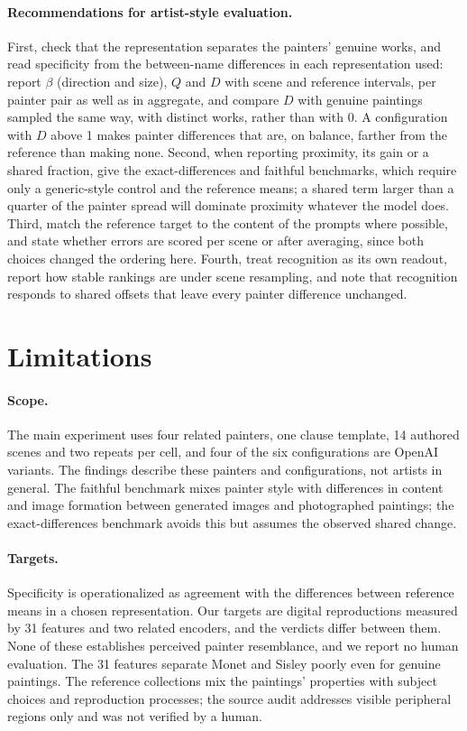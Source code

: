 \documentclass[10pt]{article}
\begin{document}
\paragraph{Recommendations for artist-style evaluation.}
First, check that the representation separates the painters' genuine works, and read specificity
from the between-name differences in each representation used: report $\beta$ (direction and size),
$Q$ and $D$ with scene and reference intervals, per painter pair as well as in aggregate, and
compare $D$ with genuine paintings sampled the same way, with distinct works, rather than with 0.
A configuration with $D$ above 1 makes painter differences that are, on balance, farther from the
reference than making none. Second, when reporting proximity, its gain or a shared fraction, give
the exact-differences and faithful benchmarks, which require only a generic-style control and the
reference means; a shared term larger than a quarter of the painter spread will dominate proximity
whatever the model does. Third, match the reference target to the content of the prompts where
possible, and state whether errors are scored per scene or after averaging, since both choices
changed the ordering here. Fourth, treat recognition as its own readout, report how stable rankings
are under scene resampling, and note that recognition responds to shared offsets that leave every
painter difference unchanged.

\section{Limitations}\label{sec:limitations}

\paragraph{Scope.} The main experiment uses four related painters, one clause template, 14 authored
scenes and two repeats per cell, and four of the six configurations are OpenAI variants. The
findings describe these painters and configurations, not artists in general. The faithful benchmark
mixes painter style with differences in content and image formation between generated images and
photographed paintings; the exact-differences benchmark avoids this but assumes the observed shared
change.

\paragraph{Targets.} Specificity is operationalized as agreement with the differences between
reference means in a chosen representation. Our targets are digital reproductions measured by 31
features and two related encoders, and the verdicts differ between them. None of these establishes
perceived painter resemblance, and we report no human evaluation. The 31 features separate Monet
and Sisley poorly even for genuine paintings. The reference collections mix the paintings'
properties with subject choices and reproduction processes; the source audit addresses visible
peripheral regions only and was not verified by a human.
\end{document}
